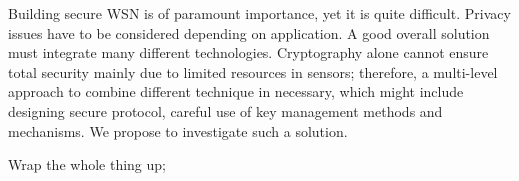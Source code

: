 \documentclass[conference,man]{IEEEtran}
\begin{document}
Building secure WSN is of paramount importance, yet it is quite difficult. Privacy issues have to be considered depending on application. A good overall solution must integrate many different technologies. Cryptography alone cannot ensure total security mainly due to limited resources in sensors; therefore, a multi-level approach to combine different technique in necessary, which might  include designing secure protocol, careful use of key management methods and mechanisms. We propose to investigate such a solution.

\label{sec:conc}
Wrap the whole thing up;



\end{document}
